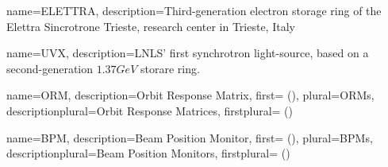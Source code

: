 {
  name={ELETTRA},
  description={Third-generation electron storage ring of the Elettra Sincrotrone Trieste, research center in Trieste, Italy}
}



{
  name={UVX},
  description={LNLS' first synchrotron light-source, based on a second-generation $1.37\unit{G eV}$ storare ring.}
}

{
  name={ORM},
  description={Orbit Response Matrix},
  first={ ()},
  plural={ORMs},
  descriptionplural={Orbit Response Matrices},
  firstplural={ ()}
}

{
  name={BPM},
  description={Beam Position Monitor},
  first={ ()},
  plural={BPMs},
  descriptionplural={Beam Position Monitors},
  firstplural={ ()}
}



